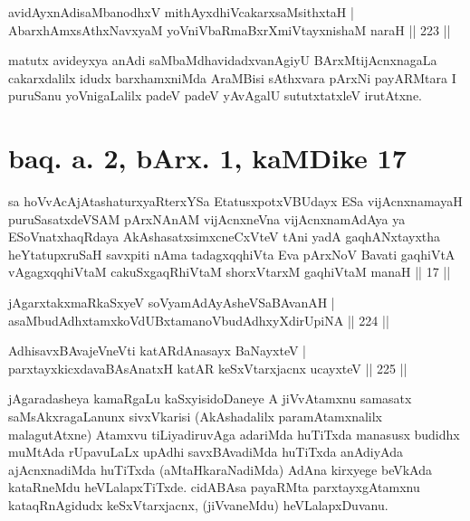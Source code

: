 \begin{shl}
avidAyxnAdisaMbanodhxV mithAyxdhiVcakarxsaMsithxtaH |\\
AbarxhAmx\s \s sAthxNavxyaM yoVniVbaRmaBxrXmiVtayxnishaM naraH \hfill || 223 ||
\end{shl}

\begin{artha}
matutx avideyxya anAdi saMbaMdhavidadxvanAgiyU BArxMtijAcnxnagaLa cakarxdalilx idudx barxhamxniMda AraMBisi sAthxvara pArxNi payARMtara I puruSanu yoVnigaLalilx padeV padeV yAvAgalU sututxtatxleV irutAtxne.
\end{artha}

\section*{baq. a. 2, bArx. 1, kaMDike 17}

\begin{shl}
sa hoVvAcAjAtashaturxyaRterxYSa EtatusxpotxV\s BUdayx ESa vijAcnxnamayaH puruSasatxdeVSAM pArxNAnAM vijAcnxneVna vijAcnxnamAdAya ya ESoV\s natxhaqRdaya AkAshasatxsimxcneCxVteV tAni yadA gaqhANxtayxtha heYtatupxruSaH savxpiti nAma tadagxqqhiVta Eva pArxNoV Bavati gaqhiVtA vAgagxqqhiVtaM cakuSxgaqRhiVtaM shorxVtarxM gaqhiVtaM manaH || 17 ||
\end{shl}


\begin{shl}
jAgarxtakxmaRkaSxyeV soV\s yamAdAyAsheVSaBAvanAH |\\
asaMbudAdhxtamxkoVdUBxtamanoVbudAdhxyXdirUpiNA \hfill || 224 ||
\end{shl}
\begin{shl}
\footnotemark AdhisavxBAvajeVneVti katAR\s \s dAnasayx BaNayxteV |\\
parxtayxkicxdavaBAsAnatxH katAR keSxVtarxjacnx ucayxteV \hfill || 225 ||
\end{shl}

\begin{artha}
jAgaradasheya kamaRgaLu kaSxyisidoDaneye A jiVvAtamxnu samasatx saMsAkxra\-gaLanunx sivxVkarisi (AkAshadalilx paramAtamxnalilx malagutAtxne) Atamxvu tiLiyadiruvAga adariMda huTiTxda manasusx budidhx muMtAda rUpavuLaLx upAdhi savxBAvadiMda huTiTxda anAdiyAda ajAcnxnadiMda huTiTxda (aMtaHkaraNadiMda) AdAna kirxyege beVkAda kataRneMdu heVLalapxTiTxde. cidABAsa payaRMta parxtayxgAtamxnu kataqRnAgidudx keSxVtarxjacnx, (jiVvaneMdu) heVLalapxDuvanu.
\end{artha}

